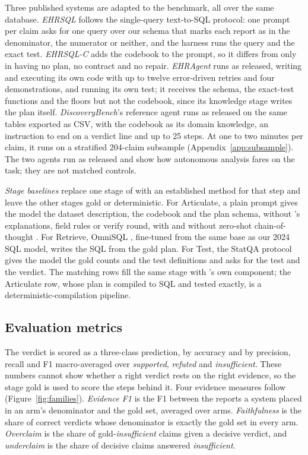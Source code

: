 Three published systems are adapted to the benchmark, all over the same
database. \emph{EHRSQL} \cite{lee2022ehrsql} follows the single-query
text-to-SQL protocol: one prompt per claim asks for one query over our schema
that marks each report as in the denominator, the numerator or neither, and
the harness runs the query and the exact test. \emph{EHRSQL-C} adds the
codebook to the prompt, so it differs from \art{} only in having no plan, no
contract and no repair. \emph{EHRAgent} \cite{shi2024ehragent} runs as
released, writing and executing its own code with up to twelve error-driven
retries and four demonstrations, and running its own test; it receives the
schema, the exact-test functions and the floors but not the codebook, since
its knowledge stage writes the plan itself. \emph{DiscoveryBench}'s reference
agent \cite{majumder2025discoverybench} runs as released on the same tables
exported as CSV, with the codebook as its domain knowledge, an instruction to
end on a verdict line and up to 25 steps. At one to two minutes per claim,
it runs on a stratified 204-claim subsample (Appendix~\ref{app:subsample}).
The two agents run as released and show how autonomous analysis fares on the
task; they are not matched controls.

\emph{Stage baselines} replace one stage of \art{} with an established method for that step and leave the other stages gold or deterministic. For Articulate, a plain prompt
gives the model the dataset description, the codebook and the plan schema,
without \art{}'s explanations, field rules or verify round, with and without
zero-shot chain-of-thought \cite{kojima2022zeroshot}. For Retrieve, OmniSQL
\cite{li2025omnisql}, fine-tuned from the same base as our 2024 SQL model,
writes the SQL from the gold plan. For Test, the StatQA protocol
\cite{zhu2024statqa} gives the model the gold counts and the test definitions
and asks for the test and the verdict. The matching \art{} rows fill the same
stage with \art{}'s own component; the Articulate row, whose plan is compiled
to SQL and tested exactly, is a deterministic-compilation pipeline.

\subsection{Evaluation metrics}
\label{sec:metrics}

The verdict is scored as a three-class prediction, by accuracy and by
precision, recall and F1 macro-averaged over \emph{supported},
\emph{refuted} and \emph{insufficient}. These numbers cannot show whether a
right verdict rests on the right evidence, so the stage gold is used to
score the steps behind it. Four evidence measures follow (Figure~\ref{fig:families}).
\emph{Evidence F1} is the F1 between the reports a system placed in an arm's
denominator and the gold set, averaged over arms. \emph{Faithfulness} is the
share of correct verdicts whose denominator is exactly the gold set in every
arm. \emph{Overclaim} is the share of gold-\emph{insufficient} claims
given a decisive verdict, and \emph{underclaim} is the share of decisive
claims answered \emph{insufficient}.

